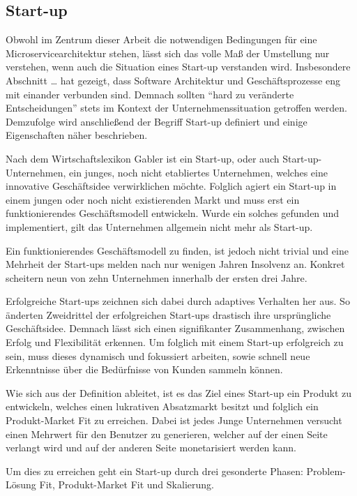 \subsection{Start-up}
Obwohl im Zentrum dieser Arbeit die notwendigen Bedingungen für eine Microservicearchitektur stehen, lässt sich das volle Maß der Umstellung nur verstehen, wenn auch die Situation eines Start-up verstanden wird. Insbesondere Abschnitt … hat gezeigt, dass Software Architektur und Geschäftsprozesse eng mit einander verbunden sind. Demnach sollten “hard zu veränderte Entscheidungen” stets im Kontext der Unternehmenssituation getroffen werden. Demzufolge wird anschließend der Begriff Start-up definiert und einige Eigenschaften näher beschrieben.

Nach dem Wirtschaftslexikon Gabler ist ein Start-up, oder auch Start-up-Unternehmen, ein junges, noch nicht etabliertes Unternehmen, welches eine innovative Geschäftsidee verwirklichen möchte. Folglich agiert ein Start-up in einem jungen oder noch nicht existierenden Markt und muss erst ein funktionierendes Geschäftsmodell entwickeln. Wurde ein solches gefunden und implementiert, gilt das Unternehmen allgemein nicht mehr als Start-up.

Ein funktionierendes Geschäftsmodell zu finden, ist jedoch nicht trivial und eine Mehrheit der Start-ups melden nach nur wenigen Jahren Insolvenz an. Konkret scheitern neun von zehn Unternehmen innerhalb der ersten drei Jahre.

Erfolgreiche Start-ups zeichnen sich dabei durch adaptives Verhalten her aus. So änderten Zweidrittel der erfolgreichen Start-ups drastisch ihre ursprüngliche Geschäftsidee. Demnach lässt sich einen signifikanter Zusammenhang, zwischen Erfolg und Flexibilität erkennen. Um folglich mit einem Start-up erfolgreich zu sein, muss dieses dynamisch und fokussiert arbeiten, sowie schnell neue Erkenntnisse über die Bedürfnisse von Kunden sammeln können.

Wie sich aus der Definition ableitet, ist es das Ziel eines Start-up ein Produkt zu entwickeln, welches einen lukrativen Absatzmarkt besitzt und folglich ein Produkt-Market Fit zu erreichen.
Dabei ist jedes Junge Unternehmen versucht einen Mehrwert für den Benutzer zu generieren, welcher auf der einen Seite verlangt wird und auf der anderen Seite monetarisiert werden kann.

Um dies zu erreichen geht ein Start-up durch drei gesonderte Phasen: Problem-Lösung Fit, Produkt-Market Fit und Skalierung.


